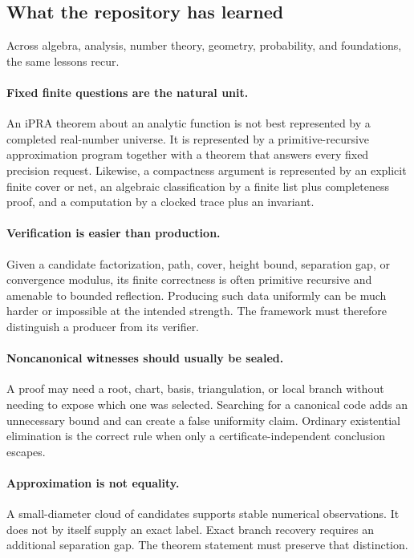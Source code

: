 \subsection{What the repository has learned}

Across algebra, analysis, number theory, geometry, probability, and foundations, the same lessons
recur.

\paragraph{Fixed finite questions are the natural unit.}
An iPRA theorem about an analytic function is not best represented by a completed real-number
universe.  It is represented by a primitive-recursive approximation program together with a theorem
that answers every fixed precision request.  Likewise, a compactness argument is represented by an
explicit finite cover or net, an algebraic classification by a finite list plus completeness proof,
and a computation by a clocked trace plus an invariant.

\paragraph{Verification is easier than production.}
Given a candidate factorization, path, cover, height bound, separation gap, or convergence modulus,
its finite correctness is often primitive recursive and amenable to bounded reflection.  Producing
such data uniformly can be much harder or impossible at the intended strength.  The framework must
therefore distinguish a producer from its verifier.

\paragraph{Noncanonical witnesses should usually be sealed.}
A proof may need a root, chart, basis, triangulation, or local branch without needing to expose which
one was selected.  Searching for a canonical code adds an unnecessary bound and can create a false
uniformity claim.  Ordinary existential elimination is the correct rule when only a
certificate-independent conclusion escapes.

\paragraph{Approximation is not equality.}
A small-diameter cloud of candidates supports stable numerical observations.  It does not by itself
supply an exact label.  Exact branch recovery requires an additional separation gap.  The theorem
statement must preserve that distinction.

